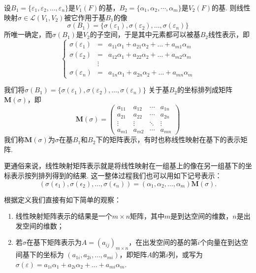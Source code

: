 \begin{definition}\label{def:7:线性映射矩阵表示}
    设$B_1=\{\varepsilon_1,\varepsilon_2,\ldots,\varepsilon_n\}$是$V_1(F)$的基，$B_2=\{\alpha_1,\alpha_2,\cdots,\alpha_m\}$是$V_2(F)$的基.
    则线性映射$\sigma \in \mathcal{L}(V_1,V_2)$被它作用于基$B_1$的像
    \[\sigma(B_1)=\{\sigma(\varepsilon_1),\sigma(\varepsilon_2),\ldots,\sigma(\varepsilon_n)\}\]
    所唯一确定，而$\sigma(B_1)$是$V_2$的子空间，于是其中元素都可以被基$B_2$线性表示，即
    \[ \left\{
     \begin{array}{rcl}
        \sigma(\varepsilon_1)&=&a_{11}\alpha_1+a_{21}\alpha_2+\ldots+a_{m1}\alpha_m \\
        \sigma(\varepsilon_2)&=&a_{12}\alpha_1+a_{22}\alpha_2+\ldots+a_{m2}\alpha_m \\
        &\vdots& \\
        \sigma(\varepsilon_n)&=&a_{1n}\alpha_1+a_{2n}\alpha_2+\ldots+a_{mn}\alpha_m
     \end{array}
    \right. \]

    我们将$\sigma(B_1)=\{\sigma(\varepsilon_1),\sigma(\varepsilon_2),\ldots,\sigma(\varepsilon_n)\}$
    关于基$B_2$的坐标排列成矩阵$\mathbf{M}(\sigma)$，即
    \[\mathbf{M}(\sigma)=\begin{pmatrix}
        a_{11} & a_{12} & \cdots & a_{1n} \\
        a_{21} & a_{22} & \cdots & a_{2n} \\
        \vdots & \vdots & \ddots & \vdots \\
        a_{m1} & a_{m2} & \cdots & a_{mn}
    \end{pmatrix}\]
    我们称$\mathbf{M}(\sigma)$为$\sigma$在基$B_1$和$B_2$下的矩阵表示，有时也称线性映射在基下的表示矩阵.
\end{definition}
更通俗来说，线性映射矩阵表示就是将线性映射在一组基上的像在另一组基下的坐标表示按列排列得到的结果.
这一整体过程我们也可以用如下记号表示：
\begin{equation}\label{eq:7:线性映射矩阵表示}
    (\sigma(\epsilon_1),\sigma(\epsilon_2),\ldots,\sigma(\epsilon_n))=(\alpha_1,\alpha_2,\ldots,\alpha_m)\mathbf{M}(\sigma).
\end{equation}

根据定义我们直接有如下简单的观察：
\begin{enumerate}
    \item 线性映射矩阵表示的结果是一个$m\times n$矩阵，其中$m$是到达空间的维数，$n$是出发空间的维数；
    \item 若$\sigma$在基下矩阵表示为$A=(a_{ij})_{m\times n}$，在出发空间的基的第$i$个向量在到达空间基下的坐标为
    $(a_{1i},a_{2i},\ldots,a_{mi})$，即矩阵$A$的第$i$列，或写为$\sigma(\varepsilon)=a_{1i}\alpha_1+a_{2i}\alpha_2+\ldots+a_{mi}\alpha_m$.
\end{enumerate}

